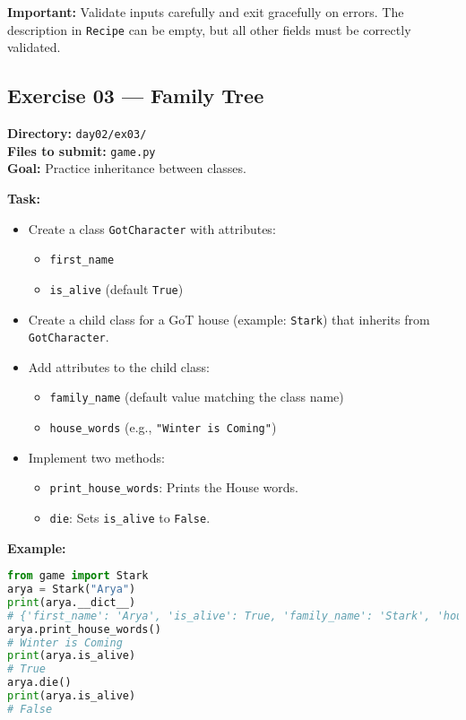 \documentclass[12pt,a4paper]{article}
\begin{document}
\textbf{Important:} Validate inputs carefully and exit gracefully on errors. The description in \texttt{Recipe} can be empty, but all other fields must be correctly validated.

\newpage
\subsection*{Exercise 03 — Family Tree}
\textbf{Directory:} \texttt{day02/ex03/}\\
\textbf{Files to submit:} \texttt{game.py}\\
\textbf{Goal:} Practice inheritance between classes.

\textbf{Task:}
\begin{itemize}
  \item Create a class \texttt{GotCharacter} with attributes:
  \begin{itemize}
    \item \texttt{first\_name}
    \item \texttt{is\_alive} (default \texttt{True})
  \end{itemize}

  \item Create a child class for a GoT house (example: \texttt{Stark}) that inherits from \texttt{GotCharacter}.
  \item Add attributes to the child class:
  \begin{itemize}
    \item \texttt{family\_name} (default value matching the class name)
    \item \texttt{house\_words} (e.g., \texttt{"Winter is Coming"})
  \end{itemize}

  \item Implement two methods:
  \begin{itemize}
    \item \texttt{print\_house\_words}: Prints the House words.
    \item \texttt{die}: Sets \texttt{is\_alive} to \texttt{False}.
  \end{itemize}

\end{itemize}

\textbf{Example:}
\begin{lstlisting}[language=Python]
from game import Stark
arya = Stark("Arya")
print(arya.__dict__)
# {'first_name': 'Arya', 'is_alive': True, 'family_name': 'Stark', 'house_words': 'Winter is Coming'}
arya.print_house_words()
# Winter is Coming
print(arya.is_alive)
# True
arya.die()
print(arya.is_alive)
# False
\end{lstlisting}
\end{document}
